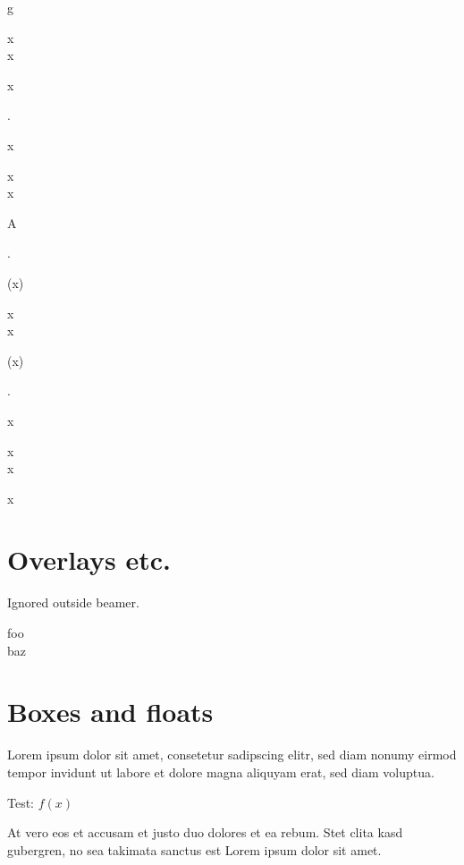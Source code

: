 \documentclass[a4paper]{article}
\begin{document}
{\begin{minipage}[t]{2em}
g

\begin{pseudo*}[hl]
x \\
x
\end{pseudo*}%

\noindent
x
\end{minipage}%
%
%
%
\begin{minipage}[t]{2em}
.

x

\begin{pseudo*}[hl]
x \\
x
\end{pseudo*}%

\noindent
A
\end{minipage}%
%
%
%
\begin{minipage}[t]{2em}
.

(x)

\begin{pseudo*}[hl]
x \\
x
\end{pseudo*}%

\noindent
(x)
\end{minipage}%
%
%
%
\begin{minipage}[t]{2em}
.

\strut x

\begin{pseudo*}[hl]
x \\
x
\end{pseudo*}%

\noindent
\strut x
\end{minipage}%
}

\section*{Overlays etc.}

Ignored outside \textsf{beamer}.

\begin{pseudo}[pause, kwfont<3>=\nf, unknown<3>=42]
    foo \\<2>
    baz
\end{pseudo}

\section*{Boxes and floats}

Lorem ipsum dolor sit amet, consetetur sadipscing elitr, sed diam nonumy eirmod
tempor invidunt ut labore et dolore magna aliquyam erat, sed diam voluptua.

\begin{tcolorbox}
    Test: $f(x)$
\end{tcolorbox}

\noindent At vero eos et accusam et justo duo dolores et ea rebum. Stet clita
kasd gubergren, no sea takimata sanctus est Lorem ipsum dolor sit amet.

\end{document}
